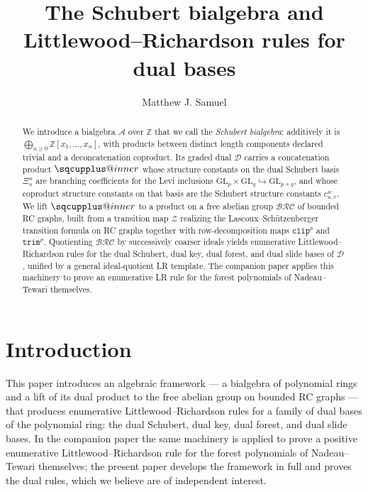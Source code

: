 \documentclass{amsart}
\title{The Schubert bialgebra and Littlewood--Richardson rules for dual bases}
\author{Matthew J. Samuel}
\makeatletter
\newcommand{\sqcupplus@inner}[2]{%
  \vcenter{\hbox{\ooalign{%
    \hfil$\m@th#1\sqcup$\hfil\cr
    \hfil\raisebox{0.15ex}{$\m@th#1\scriptscriptstyle+$}\hfil\cr
  }}}%
}
\newcommand{\sqcupplus}{\mathbin{\mathpalette\sqcupplus@inner\relax}}
\theoremstyle{definition}
\theoremstyle{remark}
\numberwithin{equation}{subsection}
\newcommand{\trm}{\mathtt{trim}}
\newcommand{\zeromap}{\mathcal{Z}}
\newcommand{\clp}{\mathtt{clip}}
\newcommand{\BRC}{\mathcal{BRC}}
\newcommand{\dsch}{\ensuremath{\Xi}}
\newcommand{\coma}{\mathcal{A}}
\newcommand{\dcoma}{\mathcal{D}}
\makeatother
\begin{document}
\begin{abstract}
We introduce a bialgebra $\coma$ over $\mathbb{Z}$ that we call the \emph{Schubert bialgebra}: additively it is $\bigoplus_{n\geq 0}\mathbb{Z}[x_1,\ldots,x_n]$, with products between distinct length components declared trivial and a deconcatenation coproduct. Its graded dual $\dcoma$ carries a concatenation product $\sqcupplus$ whose structure constants on the dual Schubert basis $\dsch_u^n$ are branching coefficients for the Levi inclusions $\mathrm{GL}_p\times\mathrm{GL}_q\hookrightarrow\mathrm{GL}_{p+q}$, and whose coproduct structure constants on that basis are the Schubert structure constants $c_{u,v}^w$. We lift $\sqcupplus$ to a product on a free abelian group $\BRC$ of bounded RC graphs, built from a transition map $\zeromap$ realizing the Lascoux--Sch\"utzenberger transition formula on RC graphs together with row-decomposition maps $\clp^p$ and $\trm^p$. Quotienting $\BRC$ by successively coarser ideals yields enumerative Littlewood--Richardson rules for the dual Schubert, dual key, dual forest, and dual slide bases of $\dcoma$, unified by a general ideal-quotient LR template. The companion paper \cite{companionforest} applies this machinery to prove an enumerative LR rule for the forest polynomials of Nadeau--Tewari themselves.
\end{abstract}

	\maketitle

\section{Introduction}

This paper introduces an algebraic framework --- a bialgebra of polynomial rings and a lift of its dual product to the free abelian group on bounded RC graphs --- that produces enumerative Littlewood--Richardson rules for a family of dual bases of the polynomial ring: the dual Schubert, dual key, dual forest, and dual slide bases. In the companion paper \cite{companionforest} the same machinery is applied to prove a positive enumerative Littlewood--Richardson rule for the forest polynomials of Nadeau--Tewari \cite{nadeau2024forest} themselves; the present paper develops the framework in full and proves the dual rules, which we believe are of independent interest.
\end{document}
